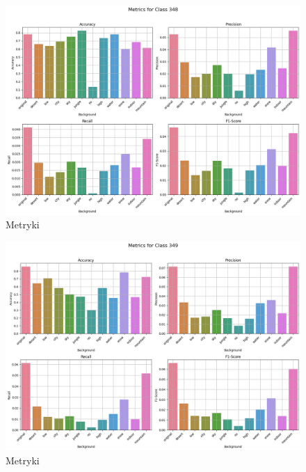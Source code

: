 \begin{figure}
	\centering\includegraphics[width=.9\textwidth]{img/348}
	\caption{Metryki}
	\label{rys:348}
\end{figure}

\begin{figure}
	\centering\includegraphics[width=.9\textwidth]{img/349}
	\caption{Metryki}
	\label{rys:349}
\end{figure}
